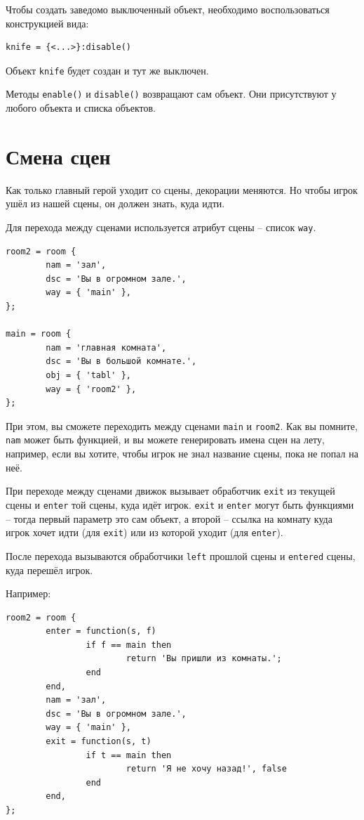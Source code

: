 \documentclass[12pt]{article}
\begin{document}
Чтобы создать заведомо выключенный объект, необходимо воспользоваться конструкцией вида:

\begin{verbatim}
knife = {<...>}:disable()
\end{verbatim}

Объект \verb/knife/ будет создан и тут же выключен.

Методы \verb/enable()/ и \verb/disable()/ возвращают сам объект. Они присутствуют у любого объекта и списка объектов.

\section{Смена сцен}


Как только главный герой уходит со сцены, декорации меняются. Но чтобы игрок ушёл из нашей сцены, он должен знать, куда идти.

Для перехода между сценами используется атрибут сцены -- список \verb/way/.

\begin{verbatim}
room2 = room {
        nam = 'зал',
        dsc = 'Вы в огромном зале.',
        way = { 'main' },
};

main = room {
        nam = 'главная комната',
        dsc = 'Вы в большой комнате.',
        obj = { 'tabl' },
        way = { 'room2' },
};
\end{verbatim}

При этом, вы сможете переходить между сценами \verb/main/ и \verb/room2/. Как вы помните, \verb/nam/ может быть функцией, и вы можете генерировать имена сцен на лету, например, если вы хотите, чтобы игрок не знал название сцены, пока не попал на неё.

При переходе между сценами движок вызывает обработчик \verb/exit/ из текущей сцены и \verb/enter/ той сцены, куда идёт игрок. \verb/exit/ и \verb/enter/ могут быть функциями -- тогда первый параметр это сам объект, а второй -- ссылка на комнату куда игрок хочет идти (для \verb/exit/) или из которой уходит (для \verb/enter/).

После перехода вызываются обработчики \verb/left/ прошлой сцены и \verb/entered/ сцены, куда перешёл игрок.

Например:

\begin{verbatim}
room2 = room {
        enter = function(s, f)
                if f == main then
                        return 'Вы пришли из комнаты.';
                end
        end,
        nam = 'зал',
        dsc = 'Вы в огромном зале.',
        way = { 'main' },
        exit = function(s, t)
                if t == main then
                        return 'Я не хочу назад!', false
                end
        end,
};
\end{verbatim}
\end{document}
